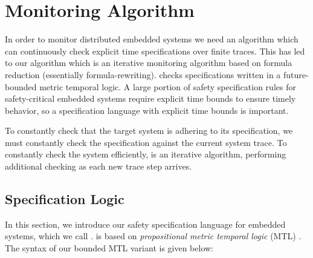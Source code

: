 
\section{Monitoring Algorithm}

In order to monitor distributed embedded systems we need an algorithm which can continuously check explicit time specifications over finite traces. This has led to our algorithm \monitor which is an iterative monitoring algorithm based on formula reduction (essentially formula-rewriting). 
%
\monitor checks specifications written in a future-bounded metric temporal logic. A large portion of safety specification rules for safety-critical embedded systems require explicit time bounds to ensure timely behavior, so a specification language with explicit time bounds is important. 

To constantly check that the target system is adhering to its specification, we must constantly check the specification against the current system trace. To constantly check the system efficiently, \monitor is an iterative algorithm, performing additional checking as each new trace step arrives.


\subsection{Specification Logic}
In this section, we introduce our safety specification language for embedded systems, which we call \planguage. \planguage is based on \emph{propositional metric temporal logic} (MTL) \cite{}. 
The syntax of our bounded MTL variant \planguage is given below:

